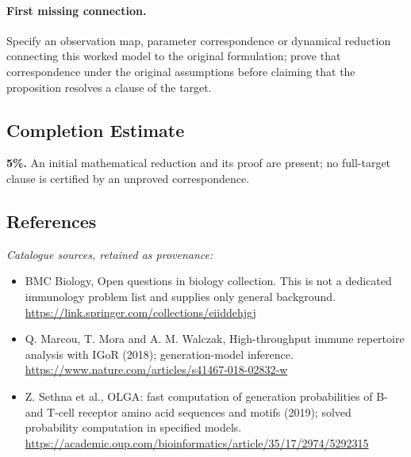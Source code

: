 \documentclass[11pt]{article}
\begin{document}
\paragraph{First missing connection.} Specify an observation map, parameter correspondence or dynamical reduction connecting this worked model to the original formulation; prove that correspondence under the original assumptions before claiming that the proposition resolves a clause of the target.
\subsection{Completion Estimate}
\textbf{5\%.} An initial mathematical reduction and its proof are present; no full-target clause is certified by an unproved correspondence.
\subsection{References}
\noindent\emph{Catalogue sources, retained as provenance:}
\begin{itemize}
\item BMC Biology, Open questions in biology collection. This is not a dedicated immunology problem list and supplies only general background. \url{https://link.springer.com/collections/eiiddehjgj}
\item Q. Marcou, T. Mora and A. M. Walczak, High-throughput immune repertoire analysis with IGoR (2018); generation-model inference. \url{https://www.nature.com/articles/s41467-018-02832-w}
\item Z. Sethna et al., OLGA: fast computation of generation probabilities of B- and T-cell receptor amino acid sequences and motifs (2019); solved probability computation in specified models. \url{https://academic.oup.com/bioinformatics/article/35/17/2974/5292315}
\end{itemize}
\end{document}
